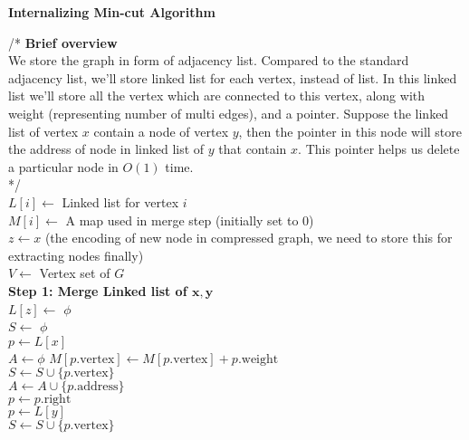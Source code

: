 \documentclass[a4paper]{article}
\begin{document}
\begin{question}
\textbf{Internalizing Min-cut Algorithm}
\end{question}
\begin{algorithm}[H]
\SetAlgoLined
{}
  /* \textbf{Brief overview}\\
    We store the graph in form of adjacency list. Compared to the standard adjacency list, we'll store linked list for each vertex, instead of list. In this linked list we'll store all the vertex which are connected to this vertex, along with weight (representing number of multi edges), and a pointer. Suppose the linked list of vertex $x$ contain a node of vertex $y$, then the pointer in this node will store the address of node in linked list of $y$ that contain $x$. This pointer helps us delete a particular node in $O(1)$ time. 
    \\
  */\\
  $L[i] \leftarrow$ Linked list for vertex $i$ \\
  $M[i] \leftarrow$ A map used in merge step (initially set to $0$)\\
  $z \leftarrow x$ (the encoding of new node in compressed graph, we need to store this for extracting nodes finally) \\
  $V \leftarrow$ Vertex set of $G$ \\
  \textbf{Step 1: Merge Linked list of $\mathbf{x, y}$} \\
  $L[z] \leftarrow$ $\phi$ \\
  $S \leftarrow$ $\phi$ \\
  $p \leftarrow L[x]$ \\
  $A \leftarrow \phi$
   {
    $M[p.\text{vertex}] \leftarrow M[p.\text{vertex}] + p.\text{weight}$ \\
    $S \leftarrow S \cup \{ p.\text{vertex} \}$ \\
    $A \leftarrow A \cup \{ p.\text{address} \}$ \\
    $p \leftarrow p.\text{right}$ \\
  }
  $p \leftarrow L[y]$ \\
   {
     {
      $S \leftarrow S \cup \{ p.\text{vertex} \}$ \\
}}
\end{algorithm}
\end{document}

